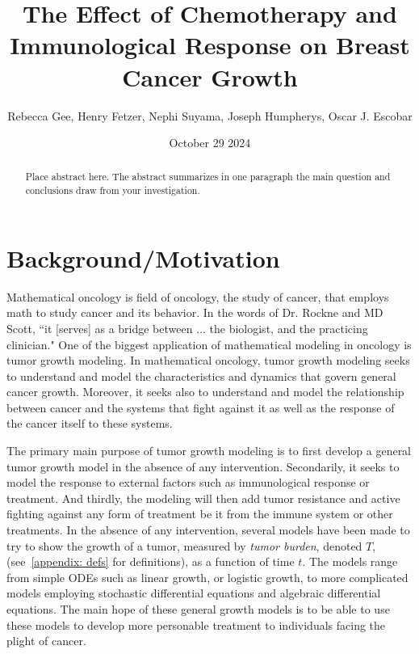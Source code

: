 \documentclass[11pt]{amsart}
\title{The Effect of Chemotherapy and Immunological Response on Breast Cancer Growth}
\author{Rebecca Gee, Henry Fetzer, Nephi Suyama, Joseph Humpherys, Oscar J. Escobar}
\date{October 29 2024} %
\begin{document}
\maketitle %

\begin{abstract}
Place abstract here. The abstract summarizes in one paragraph the main question and conclusions draw from your investigation.
\end{abstract}

\section{Background/Motivation}

Mathematical oncology is field of oncology, the study of cancer, that employs math to study cancer and its behavior.
In the words of Dr. Rockne and MD Scott, ``it [serves] as a bridge between $\ldots$ the biologist, and the practicing clinician." \cite{IntroMathOnc}
One of the biggest application of mathematical modeling in oncology is tumor growth modeling.
In mathematical oncology, tumor growth modeling seeks to understand and model the characteristics and dynamics that govern general cancer growth.
Moreover, it seeks also to understand and model the relationship between cancer and the systems that fight against it as well as the response of the cancer itself to these systems.

The primary main purpose of tumor growth modeling is to first develop a general tumor growth model in the absence of any intervention.
Secondarily, it seeks to model the response to external factors such as immunological response or treatment. 
And thirdly, the modeling will then add tumor resistance and active fighting against any form of treatment be it from the immune system or other treatments.
In the absence of any intervention, several models have been made to try to show the growth of a tumor, measured by \textit{tumor burden}, denoted $T$, (see\ \ref{appendix: defs} for definitions), as a function of time $t$.
The models range from simple ODEs such as linear growth, or logistic growth, to more complicated models employing stochastic differential equations and algebraic differential equations. 
The main hope of these general growth models is to be able to use these models to develop more personable treatment to individuals facing the plight of cancer.\ \cite{YinMoes}
\end{document}
